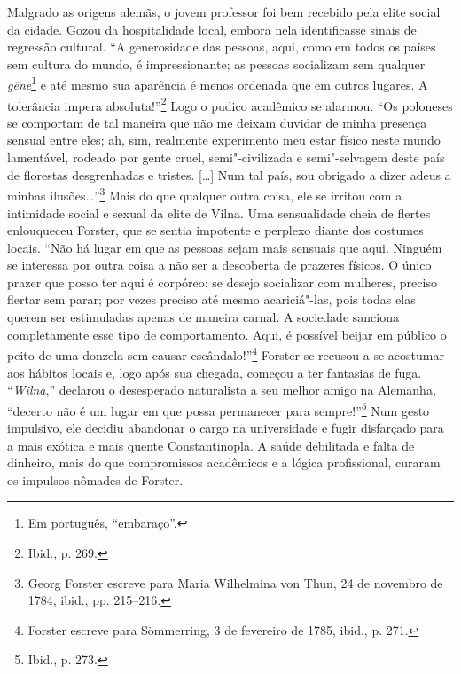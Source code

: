 \asterisc

Malgrado as origens alemãs, o jovem professor foi bem recebido pela
elite social da cidade. Gozou da hospitalidade local, embora nela
identificasse sinais de regressão cultural. ``A generosidade das
pessoas, aqui, como em todos os países sem cultura do mundo, é
impressionante; as pessoas socializam sem qualquer \textit{gêne}\footnote{Em português, ``embaraço''.} 
e até mesmo sua aparência é menos ordenada que em outros
lugares. A tolerância impera absoluta!''\footnote{Ibid., p. 269.} Logo o
pudico acadêmico se alarmou. ``Os poloneses se comportam de tal maneira
que não me deixam duvidar de minha presença sensual entre eles; ah, sim,
realmente experimento meu estar físico neste mundo lamentável, rodeado
por gente cruel, semi"-civilizada e semi"-selvagem deste país de florestas
desgrenhadas e tristes. [\ldots{}] Num tal país, sou obrigado a dizer adeus
a minhas ilusões\ldots{}''\footnote{Georg Forster escreve para Maria Wilhelmina von Thun, 24 de novembro de 1784, ibid., pp. 215--216.} Mais do que qualquer outra coisa, ele se irritou com a intimidade social e
sexual da elite de Vilna. Uma sensualidade cheia de flertes enlouqueceu
Forster, que se sentia impotente e perplexo diante dos costumes locais.
``Não há lugar em que as pessoas sejam mais sensuais que aqui. Ninguém
se interessa por outra coisa a não ser a descoberta de prazeres físicos.
O único prazer que posso ter aqui é corpóreo: se desejo socializar com
mulheres, preciso flertar sem parar; por vezes preciso até mesmo
acariciá"-las, pois todas elas querem ser estimuladas apenas de maneira
carnal. A sociedade sanciona completamente esse tipo de comportamento.
Aqui, é possível beijar em público o peito de uma donzela sem causar
escândalo!''\footnote{Forster escreve para Sömmerring, 3 de fevereiro de 1785, ibid., p. 271.} Forster se recusou a se acostumar aos hábitos locais e, logo após sua chegada, começou a ter fantasias de fuga.
``\textit{Wilna},'' declarou o desesperado naturalista a seu melhor amigo na
Alemanha, ``decerto não é um lugar em que possa permanecer para
sempre!''\footnote{Ibid., p. 273.} Num gesto impulsivo, ele decidiu
abandonar o cargo na universidade e fugir disfarçado para a mais exótica
e mais quente Constantinopla. A saúde debilitada e falta de dinheiro,
mais do que compromissos acadêmicos e a lógica profissional, curaram os
impulsos nômades de Forster.

